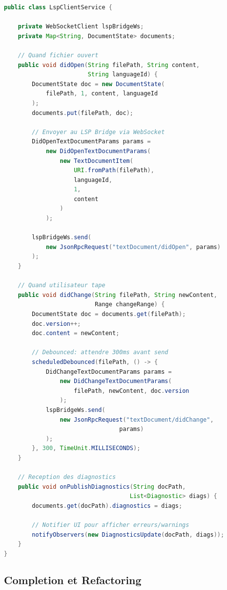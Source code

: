 \documentclass[11pt,a4paper,hidelinks]{book}
\begin{document}
\begin{lstlisting}[language=Java, caption={Cycle de Vie LSP Document}]
public class LspClientService {
    
    private WebSocketClient lspBridgeWs;
    private Map<String, DocumentState> documents;
    
    // Quand fichier ouvert
    public void didOpen(String filePath, String content, 
                        String languageId) {
        DocumentState doc = new DocumentState(
            filePath, 1, content, languageId
        );
        documents.put(filePath, doc);
        
        // Envoyer au LSP Bridge via WebSocket
        DidOpenTextDocumentParams params = 
            new DidOpenTextDocumentParams(
                new TextDocumentItem(
                    URI.fromPath(filePath),
                    languageId,
                    1,
                    content
                )
            );
        
        lspBridgeWs.send(
            new JsonRpcRequest("textDocument/didOpen", params)
        );
    }
    
    // Quand utilisateur tape
    public void didChange(String filePath, String newContent,
                          Range changeRange) {
        DocumentState doc = documents.get(filePath);
        doc.version++;
        doc.content = newContent;
        
        // Debounced: attendre 300ms avant send
        scheduledDebounced(filePath, () -> {
            DidChangeTextDocumentParams params =
                new DidChangeTextDocumentParams(
                    filePath, newContent, doc.version
                );
            lspBridgeWs.send(
                new JsonRpcRequest("textDocument/didChange", 
                                 params)
            );
        }, 300, TimeUnit.MILLISECONDS);
    }
    
    // Reception des diagnostics
    public void onPublishDiagnostics(String docPath, 
                                    List<Diagnostic> diags) {
        documents.get(docPath).diagnostics = diags;
        
        // Notifier UI pour afficher erreurs/warnings
        notifyObservers(new DiagnosticsUpdate(docPath, diags));
    }
}
\end{lstlisting}

\subsection{Completion et Refactoring}
\end{document}
